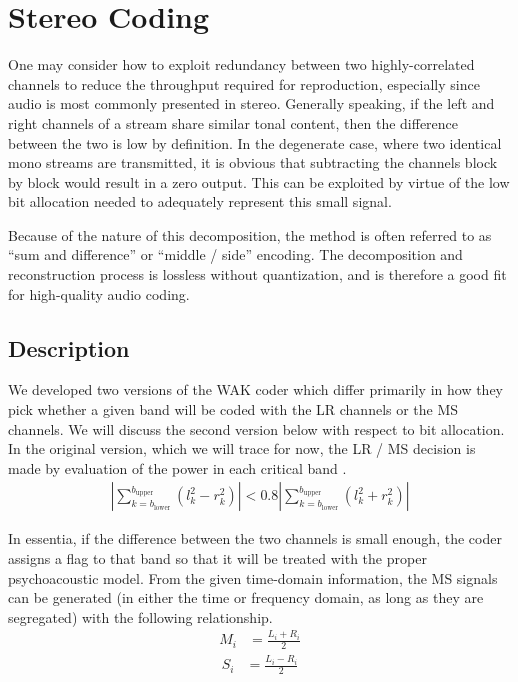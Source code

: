 \documentclass{vldb}
\begin{document}
\section{Stereo Coding}
One may consider how to exploit redundancy between two highly-correlated channels to reduce the throughput required for reproduction, especially since audio is most commonly presented in stereo. Generally speaking, if the left and right channels of a stream share similar tonal content, then the difference between the two is low by definition. In the degenerate case, where two identical mono streams are transmitted, it is obvious that subtracting the channels block by block would result in a zero output. This can be exploited by virtue of the low bit allocation needed to adequately represent this small signal.

Because of the nature of this decomposition, the method is often referred to as ``sum and difference'' or ``middle / side'' encoding. The decomposition and reconstruction process is lossless without quantization, and is therefore a good fit for high-quality audio coding.

\subsection{Description}
We developed two versions of the WAK coder which differ primarily in how they pick whether a given band will be coded with the LR channels or the MS channels. We will discuss the second version below with respect to bit allocation. In the original version, which we will trace for now, the LR / MS decision is made by evaluation of the power in each critical band \cite{Bosi1997}.
\begin{align}
\left| \displaystyle\sum_{k=b_{\text{lower}}}^{b_{\text{upper}}} \left( l_{k} ^{2} - r_{k} ^2 \right) \right| < 0.8 \left| \displaystyle\sum_{k=b_{\text{lower}}}^{b_{\text{upper}}} \left( l_{k} ^{2} + r_{k} ^2 \right) \right| 
\end{align}

In essentia, if the difference between the two channels is small enough, the coder assigns a flag to that band so that it will be treated with the proper psychoacoustic model. From the given time-domain information, the MS signals can be generated (in either the time or frequency domain, as long as they are segregated) with the following relationship.
\begin{align*}
M_i &= \frac{L_i + R_i}{2}
\end{align*}
\begin{align*}
S_i &= \frac{L_i - R_i}{2}
\end{align*}
\end{document}
